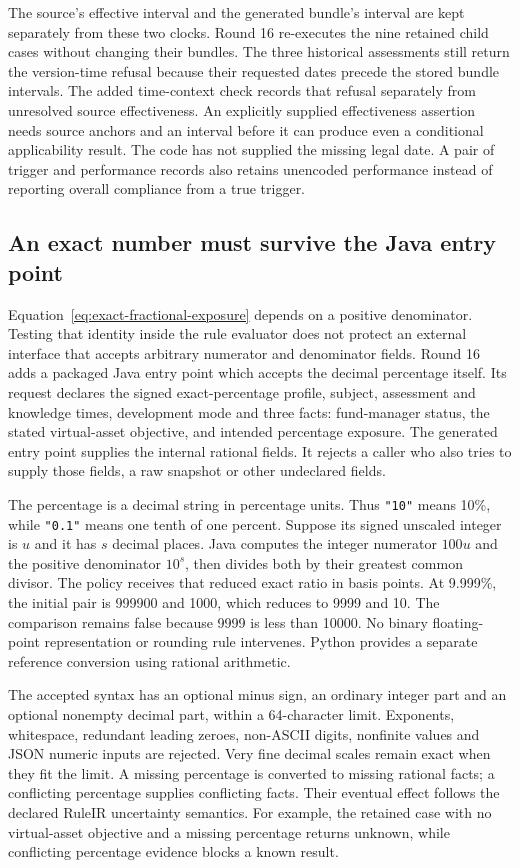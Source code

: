 \documentclass[12pt,a4paper,oneside,openany]{book}
\begin{document}
The source's effective interval and the generated bundle's interval are kept
separately from these two clocks. Round 16 re-executes the nine retained child
cases without changing their bundles. The three historical assessments still
return the version-time refusal because their requested dates precede the
stored bundle intervals. The added time-context check records that refusal
separately from unresolved source effectiveness. An explicitly supplied
effectiveness assertion needs source anchors and an interval before it can
produce even a conditional applicability result. The code has not supplied the
missing legal date. A pair of trigger and performance records also retains
unencoded performance instead of reporting overall compliance from a true
trigger.

\subsection{An exact number must survive the Java entry point}

Equation~\ref{eq:exact-fractional-exposure} depends on a positive denominator.
Testing that identity inside the rule evaluator does not protect an external
interface that accepts arbitrary numerator and denominator fields. Round 16
adds a packaged Java entry point which accepts the decimal percentage itself.
Its request declares the signed exact-percentage profile, subject, assessment
and knowledge times, development mode and three facts: fund-manager status,
the stated virtual-asset objective, and intended percentage exposure. The
generated entry point supplies the internal rational fields. It rejects a
caller who also tries to supply those fields, a raw snapshot or other
undeclared fields.

The percentage is a decimal string in percentage units. Thus \texttt{"10"}
means 10\%, while \texttt{"0.1"} means one tenth of one percent. Suppose its
signed unscaled integer is $u$ and it has $s$ decimal places. Java computes the
integer numerator $100u$ and the positive denominator $10^s$, then divides
both by their greatest common divisor. The policy receives that reduced exact
ratio in basis points. At 9.999\%, the initial pair is 999900 and 1000, which
reduces to 9999 and 10. The comparison remains false because 9999 is less than
10000. No binary floating-point representation or rounding rule intervenes.
Python provides a separate reference conversion using rational arithmetic.

The accepted syntax has an optional minus sign, an ordinary integer part and
an optional nonempty decimal part, within a 64-character limit. Exponents,
whitespace, redundant leading zeroes, non-ASCII digits, nonfinite values and
JSON numeric inputs are rejected. Very fine decimal scales remain exact when
they fit the limit. A missing percentage is converted to missing rational
facts; a conflicting percentage supplies conflicting facts. Their eventual
effect follows the declared RuleIR uncertainty semantics. For example, the
retained case with no virtual-asset objective and a missing percentage returns
unknown, while conflicting percentage evidence blocks a known result.
\end{document}
